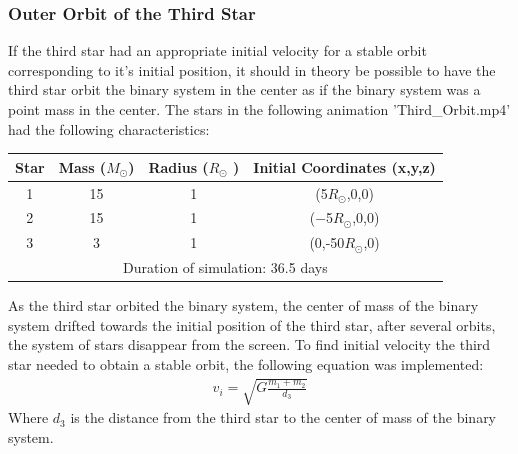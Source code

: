 \documentclass[10pt,letterpaper]{article}
\begin{document}
\subsubsection{Outer Orbit of the Third Star}
If the third star had an appropriate initial velocity for a stable orbit corresponding to it's initial position, it should in theory be possible to have the third star orbit the binary system in the center as if the binary system was a point mass in the center. The stars in the following animation 'Third\_Orbit.mp4' had the following characteristics:
\begin{table}[!htb]
\centering
\begin{tabular}{| c | c | c | c |}
\hline
Star & Mass ($M_{\odot}$) & Radius ($R_{\odot}$ ) & Initial Coordinates (x,y,z)\\
\hline
1 & 15 & 1 & (5$R_{\odot}$,0,0) \\
\hline
2 & 15 & 1 & ($-$5$R_{\odot}$,0,0) \\
\hline 
3 & 3 & 1 & (0,-50$R_{\odot}$,0) \\
\hline
\multicolumn{4}{|c|}{Duration of simulation: 36.5 days} \\
\hline
\end{tabular}
\end{table}
As the third star orbited the binary system, the center of mass of the binary system drifted towards the initial position of the third star, after several orbits, the system of stars disappear from the screen. To find initial velocity the third star needed to obtain a stable orbit, the following equation was implemented:
\begin{align}
v_i = \sqrt{G\frac{m_1 + m_2}{d_3}}
\end{align}
Where $d_3$ is the distance from the third star to the center of mass of the binary system.
\end{document}
